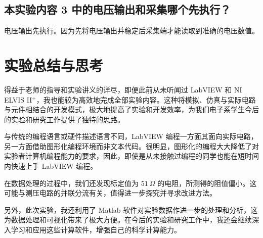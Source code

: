 \documentclass[UTF8]{article}
\theoremstyle{MyLineTheoremStyle} %
\theoremstyle{MyBlockTheoremStyle} %
\theoremstyle{MySubsubsectionStyle} %
\begin{document}
\subsection{本实验内容 3 中的电压输出和采集哪个先执行？}

电压输出先执行。因为先将电压输出并稳定后采集端才能读取到准确的电压数值。

\section{实验总结与思考}

得益于老师的指导和实验讲义的详尽，即便此前从未听闻过 LabVIEW 和 NI ELVIS II$^+$，我也能较为高效地完成全部实验内容。这种将模拟、仿真与实际电路与元件相结合的开发模式，极大地提高了实验和开发效率，为我们电子系学生今后的实验和研究工作提供了独特的思路。

与传统的编程语言或硬件描述语言不同，LabVIEW 编程一方面其面向实际电路，另一方面借助图形化编程环境而非文本代码。很明显，图形化的编程大大降低了对实验者计算机编程能力的要求，因此，即使是从未接触过编程的同学也能在短时间内快速上手 LabVIEW 编程。

在数据处理的过程中，我们还发现标定值为 $51 \ \Omega$ 的电阻，所测得的阻值偏小。这可能与测压电路的并联分流有关，值得进一步探究并寻求改进方法。

另外，此次实验，我还利用了 Matlab 软件对实验数据作进一步的处理和分析，这为数据处理和可视化带来了极大方便。在今后的实验和研究工作中，我还会继续深入学习和应用这些计算软件，增强自己的科学计算能力。
\end{document}
